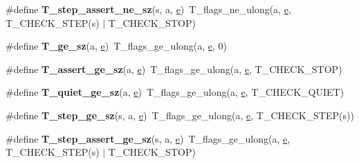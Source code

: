\begin{DoxyCompactItemize}
\#define {\bfseries T\+\_\+step\+\_\+assert\+\_\+ne\+\_\+sz}(s,  a,  \mbox{\hyperlink{sun4u_2tte_8h_a8b0b9ed08e0e18920ec2682f48228c27}{e}})~T\+\_\+flags\+\_\+ne\+\_\+ulong(a, \mbox{\hyperlink{sun4u_2tte_8h_a8b0b9ed08e0e18920ec2682f48228c27}{e}}, T\+\_\+\+C\+H\+E\+C\+K\+\_\+\+S\+T\+EP(s) $\vert$ T\+\_\+\+C\+H\+E\+C\+K\+\_\+\+S\+T\+OP)
\item 
\mbox{\label{group__RTEMSTestFrameworkChecksSZ_ga3f86e4e28ec84ff0ad3f4e3d1b37a395}} 
\#define {\bfseries T\+\_\+ge\+\_\+sz}(a,  \mbox{\hyperlink{sun4u_2tte_8h_a8b0b9ed08e0e18920ec2682f48228c27}{e}})~T\+\_\+flags\+\_\+ge\+\_\+ulong(a, \mbox{\hyperlink{sun4u_2tte_8h_a8b0b9ed08e0e18920ec2682f48228c27}{e}}, 0)
\item 
\mbox{\label{group__RTEMSTestFrameworkChecksSZ_ga682702b0569497a9b42559e4ac42a32a}} 
\#define {\bfseries T\+\_\+assert\+\_\+ge\+\_\+sz}(a,  \mbox{\hyperlink{sun4u_2tte_8h_a8b0b9ed08e0e18920ec2682f48228c27}{e}})~T\+\_\+flags\+\_\+ge\+\_\+ulong(a, \mbox{\hyperlink{sun4u_2tte_8h_a8b0b9ed08e0e18920ec2682f48228c27}{e}}, T\+\_\+\+C\+H\+E\+C\+K\+\_\+\+S\+T\+OP)
\item 
\mbox{\label{group__RTEMSTestFrameworkChecksSZ_gae9fb20bacfb2681b640eadca6fd4ca28}} 
\#define {\bfseries T\+\_\+quiet\+\_\+ge\+\_\+sz}(a,  \mbox{\hyperlink{sun4u_2tte_8h_a8b0b9ed08e0e18920ec2682f48228c27}{e}})~T\+\_\+flags\+\_\+ge\+\_\+ulong(a, \mbox{\hyperlink{sun4u_2tte_8h_a8b0b9ed08e0e18920ec2682f48228c27}{e}}, T\+\_\+\+C\+H\+E\+C\+K\+\_\+\+Q\+U\+I\+ET)
\item 
\mbox{\label{group__RTEMSTestFrameworkChecksSZ_ga10dcbcdaa6fd56bc669f2b1795738336}} 
\#define {\bfseries T\+\_\+step\+\_\+ge\+\_\+sz}(s,  a,  \mbox{\hyperlink{sun4u_2tte_8h_a8b0b9ed08e0e18920ec2682f48228c27}{e}})~T\+\_\+flags\+\_\+ge\+\_\+ulong(a, \mbox{\hyperlink{sun4u_2tte_8h_a8b0b9ed08e0e18920ec2682f48228c27}{e}}, T\+\_\+\+C\+H\+E\+C\+K\+\_\+\+S\+T\+EP(s))
\item 
\mbox{\label{group__RTEMSTestFrameworkChecksSZ_gaeae44ed36a5b2d215893041fd2277a96}} 
\#define {\bfseries T\+\_\+step\+\_\+assert\+\_\+ge\+\_\+sz}(s,  a,  \mbox{\hyperlink{sun4u_2tte_8h_a8b0b9ed08e0e18920ec2682f48228c27}{e}})~T\+\_\+flags\+\_\+ge\+\_\+ulong(a, \mbox{\hyperlink{sun4u_2tte_8h_a8b0b9ed08e0e18920ec2682f48228c27}{e}}, T\+\_\+\+C\+H\+E\+C\+K\+\_\+\+S\+T\+EP(s) $\vert$ T\+\_\+\+C\+H\+E\+C\+K\+\_\+\+S\+T\+OP)

\end{DoxyCompactItemize}
